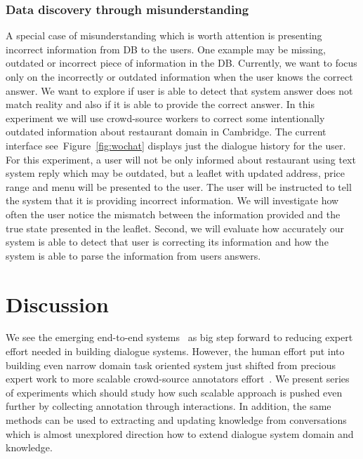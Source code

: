 \documentclass[11pt]{article}
\begin{document}
\subsubsection*{Data discovery through misunderstanding}
A special case of misunderstanding which is worth attention is presenting incorrect information from DB to the users.
One example may be missing, outdated or incorrect piece of information in the DB.
Currently, we want to focus only on the incorrectly or outdated information when the user knows the correct answer.
We want to explore if user is able to detect that system answer does not match reality and also if it is able to provide the correct answer.
In this experiment we will use crowd-source workers to correct some intentionally outdated information about restaurant domain in Cambridge.
The current interface see~Figure~\ref{fig:wochat} displays just the dialogue history for the user.
For this experiment, a user will not be only informed about restaurant using text system reply which may be outdated, but a leaflet with updated address, price range and menu will be presented to the user.
The user will be instructed to tell the system that it is providing incorrect information.
We will investigate how often the user notice the mismatch between the information provided and the true state presented in the leaflet.
Second, we will evaluate how accurately our system is able to detect that user is correcting its information and how the system is able to parse the information from users answers.



\section{Discussion}
\label{sec:discussion}

We see the emerging end-to-end systems~\cite{williams2016end,weston2015endtoend_prereq,wen_networkbased_2016} as big step forward to reducing expert effort needed in building dialogue systems.
However, the human effort put into building even narrow domain task oriented system just shifted from precious expert work to more scalable crowd-source annotators effort~\cite{wen_networkbased_2016,serban_building_2015}.
We present series of experiments which should study how such scalable approach is pushed even further by collecting annotation through interactions.
In addition, the same methods can be used to extracting and updating knowledge from conversations which is almost unexplored direction how to extend dialogue system domain and knowledge.
\end{document}
